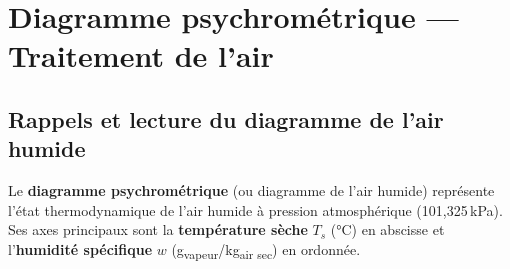 \section{Diagramme psychrométrique — Traitement de l'air}

\subsection{Rappels et lecture du diagramme de l'air humide}

Le \textbf{diagramme psychrométrique} (ou diagramme de l'air humide) représente l'état thermodynamique de l'air humide à pression atmosphérique (101,325\,kPa). Ses axes principaux sont la \textbf{température sèche} $T_s$ (°C) en abscisse et l'\textbf{humidité spécifique} $w$ (g\textsubscript{vapeur}/kg\textsubscript{air sec}) en ordonnée.

